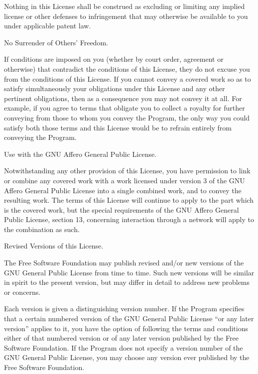 Nothing in this License shall be construed as excluding or limiting any implied license or other defenses to infringement that may otherwise be available to you under applicable patent law.

\item No Surrender of Others' Freedom.

If conditions are imposed on you (whether by court order, agreement or otherwise) that contradict the conditions of this License, they do not excuse you from the conditions of this License.  If you cannot convey a covered work so as to satisfy simultaneously your obligations under this License and any other pertinent obligations, then as a consequence you may not convey it at all.  For example, if you agree to terms that obligate you to collect a royalty for further conveying from those to whom you convey the Program, the only way you could satisfy both those terms and this License would be to refrain entirely from conveying the Program.

\item Use with the GNU Affero General Public License.

Notwithstanding any other provision of this License, you have permission to link or combine any covered work with a work licensed under version 3 of the GNU Affero General Public License into a single combined work, and to convey the resulting work.  The terms of this License will continue to apply to the part which is the covered work, but the special requirements of the GNU Affero General Public License, section 13, concerning interaction through a network will apply to the combination as such.

\item Revised Versions of this License.

The Free Software Foundation may publish revised and/or new versions of the GNU General Public License from time to time.  Such new versions will be similar in spirit to the present version, but may differ in detail to address new problems or concerns.

Each version is given a distinguishing version number.  If the Program specifies that a certain numbered version of the GNU General Public License ``or any later version'' applies to it, you have the option of following the terms and conditions either of that numbered version or of any later version published by the Free Software Foundation.  If the Program does not specify a version number of the GNU General Public License, you may choose any version ever published by the Free Software Foundation.

